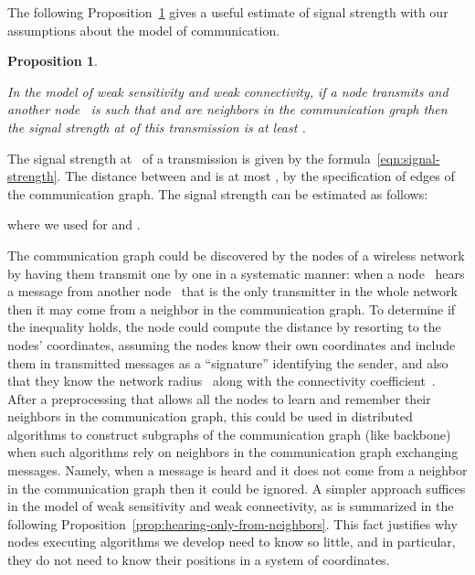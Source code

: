 \documentclass[11pt]{article}
\newcommand{\qed}{\hfill  \smallskip}
\newenvironment{proof}{\noindent{\bf Proof:}}{\qed}
\newtheorem{proposition}{Proposition}
\begin{document}
The following Proposition~\ref{prop:signal-strength} gives a useful estimate of signal strength with our assumptions about the model of communication.




\begin{proposition}
\label{prop:signal-strength}

In the model of weak sensitivity and weak connectivity, if a node  transmits and another node~ is such that  and  are neighbors in the communication graph then the signal strength at  of this transmission is at least
.
\end{proposition}

\begin{proof}
The signal strength  at~ of a transmission is given by the formula~\eqref{eqn:signal-strength}.
The distance between  and  is at most , by the specification of edges of the communication graph.
The signal strength can be estimated as follows:

where we used  for  and .
\end{proof}


The communication graph could be discovered by the nodes of a wireless network by having them transmit one by one in a systematic manner: when a node~ hears a message from another node~ that is the only transmitter in the whole network then it may come from a neighbor in the communication graph.
To determine if the inequality  holds, the node  could compute the distance  by resorting to the nodes'  coordinates, assuming the nodes know their own coordinates and include them in transmitted messages as a ``signature'' identifying the sender, and also that they know the network radius~ along with the connectivity coefficient~.
After a preprocessing that allows all the nodes to learn and remember their neighbors in the communication graph, this could be used in distributed algorithms to construct subgraphs of the communication graph (like backbone) when such algorithms rely on neighbors in the communication graph exchanging messages.
Namely, when a message is heard and it does not come from a neighbor in the communication graph then it could be ignored.
A simpler approach suffices in the model of weak sensitivity and weak connectivity, as is summarized in the following Proposition~\ref{prop:hearing-only-from-neighbors}.
This fact justifies why nodes executing algorithms we develop need to know so little, and in particular, they do not need to know their positions in a system of coordinates.
\end{document}
